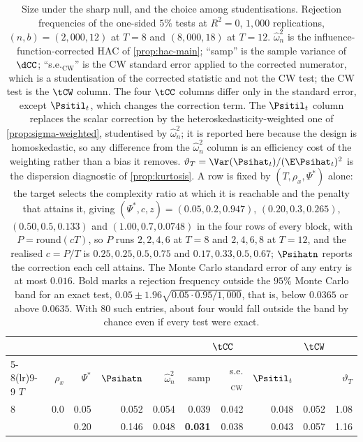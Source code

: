 \begin{table}[htbp]
\centering
\caption{Size under the sharp null, and the choice among studentisations. Rejection frequencies of the one-sided $5\%$ tests at $R^2=0$, $1{,}000$ replications, $(n,b)=(2{,}000,12)$ at $T=8$ and $(8{,}000,18)$ at $T=12$. $\hat\omega^2_n$ is the influence-function-corrected HAC of \cref{prop:hac-main}; ``samp'' is the sample variance of $\dCC$; ``s.e.$_{\mathrm{CW}}$'' is the CW standard error applied to the corrected numerator, which is a studentisation of the corrected statistic and not the CW test; the CW test is the $\tCW$ column. The four $\tCC$ columns differ only in the standard error, except $\Psitil_t$, which changes the correction term. The $\Psitil_t$ column replaces the scalar correction by the heteroskedasticity-weighted one of \cref{prop:sigma-weighted}, studentised by $\hat\omega^2_n$; it is reported here because the design is homoskedastic, so any difference from the $\hat\omega^2_n$ column is an efficiency cost of the weighting rather than a bias it removes. $\vartheta_T=\Var(\Psihat_t)/(\E\Psihat_t)^2$ is the dispersion diagnostic of \cref{prop:kurtosis}. A row is fixed by $(T,\rho_x,\Psi^*)$ alone: the target selects the complexity ratio at which it is reachable and the penalty that attains it, giving $(\Psi^*,c,z)=(0.05,0.2,0.947)$, $(0.20,0.3,0.265)$, $(0.50,0.5,0.133)$ and $(1.00,0.7,0.0748)$ in the four rows of every block, with $P=\mathrm{round}(cT)$, so $P$ runs $2,2,4,6$ at $T=8$ and $2,4,6,8$ at $T=12$, and the realised $c=P/T$ is $0.25,0.25,0.5,0.75$ and $0.17,0.33,0.5,0.67$; $\Psihatn$ reports the correction each cell attains. The Monte Carlo standard error of any entry is at most $0.016$. Bold marks a rejection frequency outside the $95\%$ Monte Carlo band for an exact test, $0.05\pm1.96\sqrt{0.05\cdot0.95/1{,}000}$, that is, below $0.0365$ or above $0.0635$. With $80$ such entries, about four would fall outside the band by chance even if every test were exact.}
\label{tab:mc-size}
\small
\begin{tabular}{lrrrrrrrrr}
\toprule
& & & & \multicolumn{4}{c}{$\tCC$} & $\tCW$ & \\
\cmidrule(lr){5-8}\cmidrule(lr){9-9}
$T$ & $\rho_x$ & $\Psi^*$ & $\Psihatn$ & $\hat\omega^2_n$ & samp & s.e.$_{\mathrm{CW}}$ & $\Psitil_t$ & & $\vartheta_T$ \\
\midrule
8 & 0.0 & 0.05 & 0.052 & 0.054 & 0.039 & 0.042 & 0.048 & 0.052 & 1.08 \\
 &  & 0.20 & 0.146 & 0.048 & \textbf{0.031} & 0.038 & 0.043 & 0.057 & 1.16 \\

\end{tabular}
\end{table}
